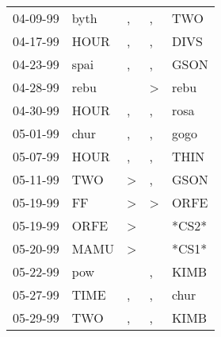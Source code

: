 \begin{supertabular}{p{0.07\textwidth}p{0.06\textwidth}p{0.02\textwidth}p{0.02\textwidth}p{0.06\textwidth}}
          04-09-99\textsuperscript{} &           byth\textsuperscript{} &                , &                , &            TWO\textsuperscript{} \\
          04-17-99\textsuperscript{} &           HOUR\textsuperscript{} &                , &                , &           DIVS\textsuperscript{} \\
          04-23-99\textsuperscript{} &           spai\textsuperscript{} &                , &                , &           GSON\textsuperscript{} \\
          04-28-99\textsuperscript{} &           rebu\textsuperscript{} &                  &     \textgreater &           rebu\textsuperscript{} \\
          04-30-99\textsuperscript{} &           HOUR\textsuperscript{} &                , &                , &           rosa\textsuperscript{} \\
          05-01-99\textsuperscript{} &           chur\textsuperscript{} &                , &                , &           gogo\textsuperscript{} \\
          05-07-99\textsuperscript{} &           HOUR\textsuperscript{} &                , &                , &           THIN\textsuperscript{} \\
          05-11-99\textsuperscript{} &            TWO\textsuperscript{} &     \textgreater &                , &           GSON\textsuperscript{} \\
          05-19-99\textsuperscript{} &             FF\textsuperscript{} &     \textgreater &     \textgreater &           ORFE\textsuperscript{} \\
          05-19-99\textsuperscript{} &           ORFE\textsuperscript{} &     \textgreater &                  &                            *CS2* \\
          05-20-99\textsuperscript{} &           MAMU\textsuperscript{} &     \textgreater &                  &                            *CS1* \\
          05-22-99\textsuperscript{} &            pow\textsuperscript{} &                  &                , &           KIMB\textsuperscript{} \\
          05-27-99\textsuperscript{} &           TIME\textsuperscript{} &                , &                , &           chur\textsuperscript{} \\
          05-29-99\textsuperscript{} &            TWO\textsuperscript{} &                , &                , &           KIMB\textsuperscript{} \\

\end{supertabular}
